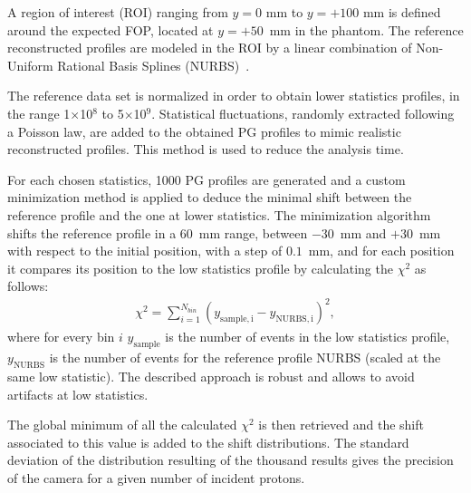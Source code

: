 A region of interest (ROI) ranging from $y=0$ mm to $y=+100$ mm is defined around the expected FOP, located at $y=+50$~mm in the phantom. The reference reconstructed profiles are modeled in the ROI by a linear combination of Non-Uniform Rational Basis Splines (NURBS)~\cite{NURBS}. 

The reference data set is normalized in order to obtain lower statistics profiles, in the range 1$\times$10$^8$ to 5$\times$10$^9$. Statistical fluctuations, randomly extracted following a Poisson law, are added to the obtained PG profiles to mimic realistic reconstructed profiles. This method is used to reduce the analysis time.

For each chosen statistics, 1000 PG profiles are generated and a custom minimization method is applied to deduce the minimal shift between the reference profile and the one at lower statistics. The minimization algorithm shifts the reference profile in a 60~mm range, between $-30$~mm and $+30$~mm with respect to the initial position, with a step of $0.1$~mm, and for each position it compares its position to the low statistics profile by calculating the $\chi^2$ as follows:
\begin{eqnarray}
\chi^2 = \sum\limits_{i=1}^{N_{bin}} {(y_{\mathrm{sample,i}}-y_{\mathrm{NURBS,i}})^2},
\end{eqnarray}
where for every bin $i$ $y_{\mathrm{sample}}$ is the number of events in the low statistics profile, $y_{\mathrm{NURBS}}$ is the number of events for the reference profile NURBS (scaled at the same low statistic). 
The described approach is robust and allows to avoid artifacts at low statistics.

The global minimum of all the calculated $\chi^2$ is then retrieved and the shift associated to this value is added to the shift distributions. %
The standard deviation of the distribution resulting of the thousand results gives the precision of the camera for a given number of incident protons. 



